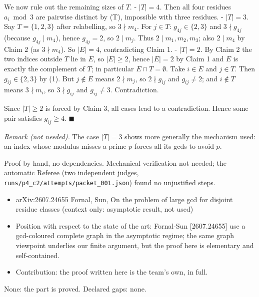 We now rule out the remaining sizes of \(T\). - \emph{\(|T|=4\).} Then
all four residues \(a_i\bmod 3\) are pairwise distinct by (T),
impossible with three residues. - \emph{\(|T|=3\).} Say \(T=\{1,2,3\}\)
after relabelling, so \(3\nmid m_4\). For \(j\in T\):
\(g_{4j}\in\{2,3\}\) and \(3\nmid g_{4j}\) (because \(g_{4j}\mid m_4\)),
hence \(g_{4j}=2\), so \(2\mid m_j\). Thus \(2\mid m_1,m_2,m_3\); also
\(2\mid m_4\) by Claim 2 (as \(3\nmid m_4\)). So \(|E|=4\),
contradicting Claim 1. - \emph{\(|T|=2\).} By Claim 2 the two indices
outside \(T\) lie in \(E\), so \(|E|\ge2\), hence \(|E|=2\) by Claim 1
and \(E\) is exactly the complement of \(T\); in particular
\(E\cap T=\emptyset\). Take \(i\in E\) and \(j\in T\). Then
\(g_{ij}\in\{2,3\}\) by (1). But \(j\notin E\) means \(2\nmid m_j\), so
\(2\nmid g_{ij}\) and \(g_{ij}\ne2\); and \(i\notin T\) means
\(3\nmid m_i\), so \(3\nmid g_{ij}\) and \(g_{ij}\ne3\). Contradiction.

Since \(|T|\ge2\) is forced by Claim 3, all cases lead to a
contradiction. Hence some pair satisfies \(g_{ij}\ge4\).
\(\blacksquare\)

\emph{Remark (not needed).} The case \(|T|=3\) shows more generally the
mechanism used: an index whose modulus misses a prime \(p\) forces all
its gcds to avoid \(p\).


Proof by hand, no dependencies. Mechanical verification not needed; the
automatic Referee (two independent judges,
\texttt{runs/p4\_c2/attempts/packet\_001.json}) found no unjustified
steps.


\begin{itemize}
\tightlist
\item
  arXiv:2607.24655 Fornal, Sun, On the problem of large gcd for disjoint
  residue classes (context only: asymptotic result, not used)
\item
  Position with respect to the state of the art: Fornal-Sun
  {[}2607.24655{]} use a gcd-coloured complete graph in the asymptotic
  regime; the same graph viewpoint underlies our finite argument, but
  the proof here is elementary and self-contained.
\item
  Contribution: the proof written here is the team's own, in full.
\end{itemize}


None: the part is proved. Declared gaps: none.

